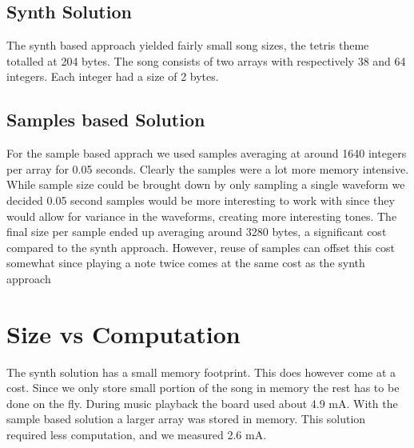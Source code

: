 \subsection{Synth Solution}
The synth based approach yielded fairly small song sizes, the tetris theme totalled at 204 bytes. The song consists of two arrays with respectively 38 and 64 integers. Each integer had a size of 2 bytes.

\subsection{Samples based Solution}
For the sample based apprach we used samples averaging at around 1640 integers per array for 0.05 seconds. Clearly the samples were a lot more memory intensive. While sample size could be brought down by only sampling a single waveform we decided 0.05 second samples would be more interesting to work with since they would allow for variance in the waveforms, creating more interesting tones. The final size per sample ended up averaging around 3280 bytes, a significant cost compared to the synth approach. However, reuse of samples can offset this cost somewhat since playing a note twice comes at the same cost as the synth approach

\section{Size vs Computation}
The synth solution has a small memory footprint. This does however come at a cost. Since we only store small portion of the song in memory the rest has to be done on the fly. During music playback the board used about 4.9 mA. With the sample based solution a larger array was stored in memory. This solution required less computation, and we measured 2.6 mA.
